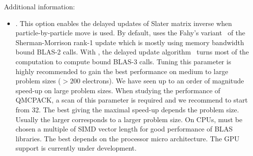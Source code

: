 Additional information:
\begin{itemize}
\item {}. This option enables the delayed updates of Slater matrix inverse when particle-by-particle move is used.
By default,  uses the Fahy's variant~\cite{Fahy1990} of the Sherman-Morrison rank-1 update which is mostly using memory bandwidth bound BLAS-2 calls.
With , the delayed update algorithm~\cite{Luo2018delayedupdate,McDaniel2017} turns most of the computation to compute bound BLAS-3 calls.
Tuning this parameter is highly recommended to gain the best performance on medium to large problem sizes ($>200$ electrons).
We have seen up to an order of magnitude speed-up on large problem sizes.
When studying the performance of QMCPACK, a scan of this parameter is required and we recommend to start from 32.
The best  giving the maximal speed-up depends the problem size.
Usually the larger  corresponds to a larger problem size.
On CPUs,  must be chosen a multiple of SIMD vector length for good performance of BLAS libraries.
The best  depends on the processor micro architecture.
The GPU support is currently under development.
\end{itemize}

